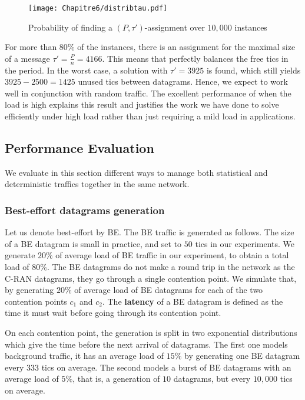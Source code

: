     \begin{figure}
       \begin{center}
      \texttt{[image: Chapitre6/distribtau.pdf]}
      \end{center}
      \caption{Probability of finding a $(P,\tau')$-assignment over $10,000$ instances}
      \label{fig:spacetau}   
     \end{figure}   

	For more than $80\%$ of the instances, there is an assignment for the maximal size of a message $\tau' = \frac{P}{n} = 4166$. This means that \SPMLS perfectly balances the free tics in the period. In the worst case, a solution with $\tau' = 3925$ is found, which still yields $3925 - 2500 = 1425$ unused tics between datagrams. Hence, we expect \SPMLS to work well in conjunction with random traffic.
	The excellent performance of \PMLS when the load is high explains this result and justifies the work we have done to solve \pall efficiently under high load rather than just requiring a mild load in applications. 

    \subsection{Performance Evaluation}
    
    We evaluate in this section different ways to manage both statistical and deterministic traffics together in the same network.
 
    \subsubsection{Best-effort datagrams generation}
    
    Let us denote best-effort by BE. The BE traffic is generated as follows. The size of a BE datagram is small in practice, and set to $50$ tics in our experiments. We generate $20\%$ of average load of BE traffic in our experiment, to obtain a total load of $80\%$. The BE datagrams do not make a round trip in the network as the C-RAN datagrams, they go through a single contention point. 
    We simulate that, by generating $20\%$ of average load of BE datagrams for each of the two contention points $c_1$ and $c_2$. The \textbf{latency} of a BE datagram is defined as the time it must wait before going
    through its contention point.

    On each contention point, the generation is split in two exponential distributions which give the time before the next arrival of datagrams. The first one models background traffic, it has an average load of $15\%$ by generating one BE datagram every $333$ tics on average. The second models a burst of BE datagrams with an average load of $5\%$, that is, a generation of $10$ datagrams, but every $10,000$ tics on average. 
   
